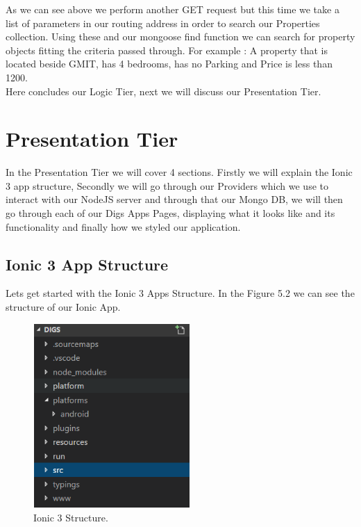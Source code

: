 As we can see above we perform another GET request but this time we take a list of parameters in our routing address in order to search our Properties collection. Using these and our mongoose find function we can search for property objects fitting the criteria passed through. For example : A property that is located beside GMIT, has 4 bedrooms, has no Parking and Price is less than 1200.\\

Here concludes our Logic Tier, next we will discuss our Presentation Tier.

\section{Presentation Tier}

In the Presentation Tier we will cover 4 sections. Firstly we will explain the Ionic 3 app structure, Secondly we will go through our Providers which we use to interact with our NodeJS server and through that our Mongo DB, we will then go through each of our Digs Apps Pages, displaying what it looks like and its functionality and finally how we styled our application.\\

\subsection{Ionic 3 App Structure}

\noindent Lets get started with the Ionic 3 Apps Structure. In the Figure 5.2 we can see the structure of our Ionic App.

\begin{figure}[h]
\centering
\includegraphics[width=6cm, height=7cm]{img/IonicStructure}
\caption{Ionic 3 Structure.}
\end{figure}


